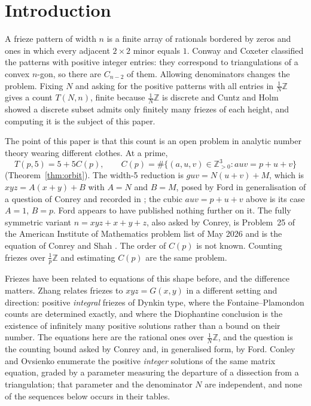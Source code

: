 \documentclass[11pt]{article}
\theoremstyle{plain}
\theoremstyle{definition}
\newcommand{\Z}{\mathbb{Z}}
\newcommand{\lat}{\tfrac{1}{N}\Z}
\begin{document}
\begin{abstract}
The reduction behind the tables holds at every width: homogenising the frieze continuant
and applying the Desnanot--Jacobi identity collapses the lattice conditions to
$gUV=N^{n-4}(U+V)+M$ with $M\mid N^2R$ and $N^{n-4}R\mid gM$, where $R$ is a continuant
window empty at width $5$.

The count at a prime is machine-checked in Lean 4 from the definition of a frieze itself,
with periodicity derived rather than assumed; Section~\ref{sec:lean} says what else is
verified and what is not.
\end{abstract}

\section{Introduction}\label{sec:intro}

A frieze pattern of width $n$ is a finite array of rationals bordered by zeros and ones in
which every adjacent $2\times2$ minor equals $1$. Conway and Coxeter \cite{CC} classified
the patterns with positive integer entries: they correspond to triangulations of a convex
$n$-gon, so there are $C_{n-2}$ of them. Allowing denominators changes the problem. Fixing
$N$ and asking for the positive patterns with all entries in $\tfrac1N\Z$ gives a count
$T(N,n)$, finite because $\lat$ is discrete and Cuntz and Holm \cite{CH19} showed a discrete
subset admits only finitely many friezes of each height, and
computing it is the subject of this paper.

The point of this paper is that this count is an open problem in analytic number theory
wearing different clothes. At a prime,
\[
  T(p,5)=5+5C(p),\qquad C(p)=\#\{(a,u,v)\in\Z_{>0}^3 : auv=p+u+v\}
\]
(Theorem~\ref{thm:orbit}). The width-5 reduction is $guv=N(u+v)+M$, which is
$xyz=A(x+y)+B$ with $A=N$ and $B=M$, posed by Ford in generalisation of a question of
Conrey and recorded in \cite{Huang}; the cubic $auv=p+u+v$ above is its case $A=1$, $B=p$.
Ford appears to have published nothing further on it. The fully symmetric variant
$n=xyz+x+y+z$, also asked by Conrey, is Problem~25 of the American Institute of Mathematics
problem list of May 2026 and is the equation of Conrey and Shah \cite{ConreyShah}. The
order of $C(p)$ is not known. Counting friezes over $\tfrac1p\Z$ and estimating $C(p)$ are
the same problem.

Friezes have been related to equations of this shape before, and the difference matters.
Zhang \cite{Zhang} relates friezes to $xyz=G(x,y)$ in a different setting and direction:
positive \emph{integral} friezes of Dynkin type, where the Fontaine--Plamondon counts are
determined exactly, and where the Diophantine conclusion is the existence of infinitely many
positive solutions rather than a bound on their number. The equations here are the rational
ones over $\lat$, and the question is the counting bound asked by Conrey and, in generalised form, by Ford. Conley and
Ovsienko \cite{CO21} enumerate the positive \emph{integer} solutions of the same matrix
equation, graded by a parameter measuring the departure of a dissection from a triangulation;
that parameter and the denominator $N$ are independent, and none of the sequences below
occurs in their tables.
\end{document}
